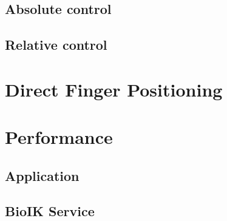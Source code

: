 \subsection{Absolute control}

\subsection{Relative control}

\section{Direct Finger Positioning}
\label{sec:impl:dfmt}

\section{Performance}

\subsection{Application}

\subsection{BioIK Service}